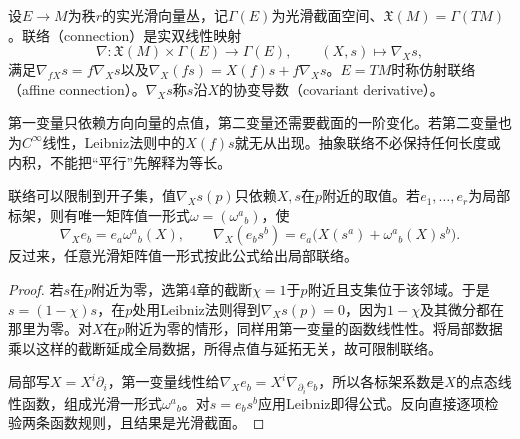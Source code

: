 \begin{definition}[向量丛联络与仿射联络]\label{def:connection}
设$E\to M$为秩$r$的实光滑向量丛，记$\Gamma(E)$为光滑截面空间、$\mathfrak X(M)=\Gamma(TM)$。联络（connection）是实双线性映射
\[
 \nabla:\mathfrak X(M)\times\Gamma(E)\to\Gamma(E),\qquad (X,s)\mapsto\nabla_Xs,
\]
满足$\nabla_{fX}s=f\nabla_Xs$以及$\nabla_X(fs)=X(f)s+f\nabla_Xs$。$E=TM$时称仿射联络（affine connection）。$\nabla_Xs$称$s$沿$X$的协变导数（covariant derivative）。
\end{definition}
第一变量只依赖方向向量的点值，第二变量还需要截面的一阶变化。若第二变量也为$C^\infty$线性，Leibniz法则中的$X(f)s$就无从出现。抽象联络不必保持任何长度或内积，不能把“平行”先解释为等长。

\begin{proposition}[局部性与局部表达]\label{prop:connection-local}
联络可以限制到开子集，值$\nabla_Xs(p)$只依赖$X,s$在$p$附近的取值。若$e_1,\ldots,e_r$为局部标架，则有唯一矩阵值一形式$\omega=(\omega^a{}_b)$，使
\[
 \nabla_Xe_b=e_a\omega^a{}_b(X),\qquad
 \nabla_X(e_b s^b)=e_a\bigl(X(s^a)+\omega^a{}_b(X)s^b\bigr).
\]
反过来，任意光滑矩阵值一形式按此公式给出局部联络。
\end{proposition}
\begin{proof}
若$s$在$p$附近为零，选第4章的截断$\chi=1$于$p$附近且支集位于该邻域。于是$s=(1-\chi)s$，在$p$处用Leibniz法则得到$\nabla_Xs(p)=0$，因为$1-\chi$及其微分都在那里为零。对$X$在$p$附近为零的情形，同样用第一变量的函数线性性。将局部数据乘以这样的截断延成全局数据，所得点值与延拓无关，故可限制联络。

局部写$X=X^i\partial_i$，第一变量线性给$\nabla_Xe_b=X^i\nabla_{\partial_i}e_b$，所以各标架系数是$X$的点态线性函数，组成光滑一形式$\omega^a{}_b$。对$s=e_b s^b$应用Leibniz即得公式。反向直接逐项检验两条函数规则，且结果是光滑截面。
\end{proof}

